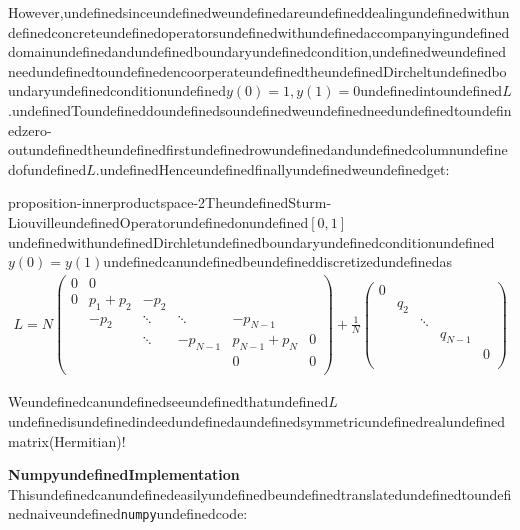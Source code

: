 However,undefinedsinceundefinedweundefinedareundefineddealingundefinedwithundefinedconcreteundefinedoperatorsundefinedwithundefinedaccompanyingundefineddomainundefinedandundefinedboundaryundefinedcondition,undefinedweundefinedneedundefinedtoundefinedencoorperateundefinedtheundefinedDircheltundefinedboundaryundefinedconditionundefined$y(0)=1, y(1)=0$undefinedintoundefined$L$.undefinedToundefineddoundefinedsoundefinedweundefinedneedundefinedtoundefinedzero-outundefinedtheundefinedfirstundefinedrowundefinedandundefinedcolumnundefinedofundefined$L$.undefinedHenceundefinedfinallyundefinedweundefinedget:

\begin{mystthmproposition}{}{proposition-innerproductspace-2}TheundefinedSturm-LiouvilleundefinedOperatorundefinedonundefined$[0,1]$undefinedwithundefinedDirchletundefinedboundaryundefinedconditionundefined$y(0)=y(1)$undefinedcanundefinedbeundefineddiscretizedundefinedas
\begin{equation}
\label{discreteSL}
\begin{aligned}
L=N\begin{pmatrix}
0 &0 & & &  &\\
0 &p_1+p_2 & -p_2& & & \\
&-p_2&  \ddots &\ddots & -p_{N-1}& \\
& & \ddots &-p_{N-1} & p_{N-1}+p_N &0 \\
& & & &0 & 0\\
\end{pmatrix} 
+ 
\frac{1}{N}\begin{pmatrix}0 & & & & \\
& q_2 & & & \\
&  & \ddots& & \\
& & & q_{N-1} & \\
& &  & & 0  \\
\end{pmatrix}
\end{aligned}
\end{equation}

\end{mystthmproposition}
Weundefinedcanundefinedseeundefinedthatundefined$L$undefinedisundefinedindeedundefinedaundefinedsymmetricundefinedrealundefinedmatrix(Hermitian)!

\textbf{NumpyundefinedImplementation}
Thisundefinedcanundefinedeasilyundefinedbeundefinedtranslatedundefinedtoundefinednaiveundefined\texttt{numpy}undefinedcode:

